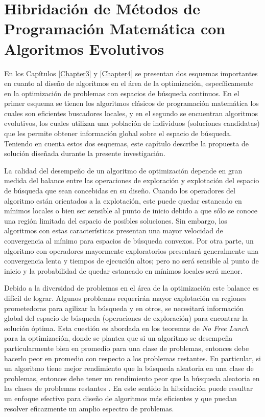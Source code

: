 \chapter{Hibridación de Métodos de Programación Matemática con Algoritmos Evolutivos} \label{Chapter6} 


En los Capítulos \ref{Chapter3} y \ref{Chapter4} se presentan dos esquemas importantes en cuanto al diseño de algoritmos en el área de la optimización, específicamente en la optimización de problemas con espacios de búsqueda continuos. En el primer esquema se tienen los algoritmos clásicos de programación matemática los cuales son eficientes buscadores locales, y  en el segundo se encuentran algoritmos evolutivos, los cuales utilizan una población de individuos (soluciones candidatas) que les permite obtener información global sobre el espacio de búsqueda. Teniendo en cuenta estos dos esquemas, este capítulo describe la propuesta de solución diseñada durante la presente investigación.

La calidad del desempeño de un algoritmo de optimización depende en gran medida del balance entre las operaciones de exploración y explotación del espacio de búsqueda que sean concebidas en su diseño. Cuando los operadores del algoritmo están orientados a la explotación, este puede quedar estancado en mínimos locales o bien ser sensible al punto de inicio debido a que sólo se conoce una región limitada del espacio de posibles soluciones. Sin embargo, los algoritmos con estas características presentan una mayor velocidad de convergencia al mínimo para espacios de búsqueda convexos. Por otra parte, un algoritmo con operadores mayormente exploratorios presentará generalmente una convergencia lenta y tiempos de ejecución altos; pero no será sensible al punto de inicio y la probabilidad de quedar estancado en mínimos locales será menor.

Debido a la diversidad de problemas en el área de la optimización este balance es difícil de lograr. Algunos problemas requerirán mayor explotación en regiones prometedoras para agilizar la búsqueda y en otros, se necesitará información global del espacio de búsqueda (operaciones de exploración) para encontrar la solución óptima. Esta cuestión es abordada en los teoremas de \textit{No Free Lunch} para la optimización, donde se plantea que si un algoritmo se desempeña particularmente bien en promedio para una clase de problemas, entonces debe hacerlo peor en promedio con respecto a los problemas restantes. En particular, si un algoritmo tiene mejor rendimiento que la búsqueda aleatoria en una clase de problemas, entonces debe tener un rendimiento peor que la búsqueda aleatoria en las clases de problemas restantes \cite{wolpert1997no}. En este sentido la hibridación puede resultar un enfoque efectivo para diseño de algoritmos más eficientes y que puedan resolver eficazmente un amplio espectro de problemas.

